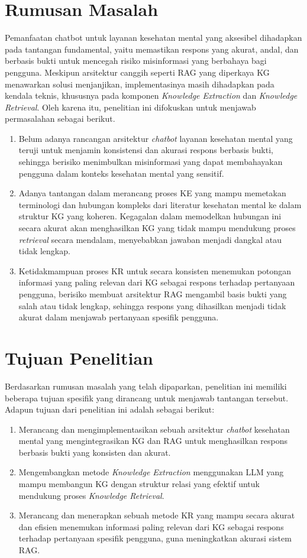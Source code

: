 \section{Rumusan Masalah}
Pemanfaatan chatbot untuk layanan kesehatan mental yang aksesibel dihadapkan pada tantangan fundamental, yaitu memastikan respons yang akurat, andal, dan berbasis bukti untuk mencegah risiko misinformasi yang berbahaya bagi pengguna.
Meskipun arsitektur canggih seperti RAG yang diperkaya KG menawarkan solusi menjanjikan, implementasinya masih dihadapkan pada kendala teknis, khususnya pada komponen \textit{Knowledge Extraction} dan \textit{Knowledge Retrieval}.
Oleh karena itu, penelitian ini difokuskan untuk menjawab permasalahan sebagai berikut.
\begin{enumerate}
	\item Belum adanya rancangan arsitektur \textit{chatbot} layanan kesehatan mental yang teruji untuk menjamin konsistensi dan akurasi respons berbasis bukti, sehingga berisiko menimbulkan misinformasi yang dapat membahayakan pengguna dalam konteks kesehatan mental yang sensitif.
	\item Adanya tantangan dalam merancang proses KE yang mampu memetakan terminologi dan hubungan kompleks dari literatur kesehatan mental ke dalam struktur KG yang koheren. Kegagalan dalam memodelkan hubungan ini secara akurat akan menghasilkan KG yang tidak mampu mendukung proses \textit{retrieval} secara mendalam, menyebabkan jawaban menjadi dangkal atau tidak lengkap.
	\item Ketidakmampuan proses KR untuk secara konsisten menemukan potongan informasi yang paling relevan dari KG sebagai respons terhadap pertanyaan pengguna, berisiko membuat arsitektur RAG mengambil basis bukti yang salah atau tidak lengkap, sehingga respons yang dihasilkan menjadi tidak akurat dalam menjawab pertanyaan spesifik pengguna.
\end{enumerate}
\section{Tujuan Penelitian}
Berdasarkan rumusan masalah yang telah dipaparkan, penelitian ini memiliki beberapa tujuan spesifik yang dirancang untuk menjawab tantangan tersebut.
Adapun tujuan dari penelitian ini adalah sebagai berikut:
\begin{enumerate}
	\item Merancang dan mengimplementasikan sebuah arsitektur \textit{chatbot} kesehatan mental yang mengintegrasikan KG dan RAG untuk menghasilkan respons berbasis bukti yang konsisten dan akurat.
	\item Mengembangkan metode \textit{Knowledge Extraction} menggunakan LLM yang mampu membangun KG dengan struktur relasi yang efektif untuk mendukung proses \textit{Knowledge Retrieval}.
	\item Merancang dan menerapkan sebuah metode KR yang mampu secara akurat dan efisien menemukan informasi paling relevan dari KG sebagai respons terhadap pertanyaan spesifik pengguna, guna meningkatkan akurasi sistem RAG.
\end{enumerate}
